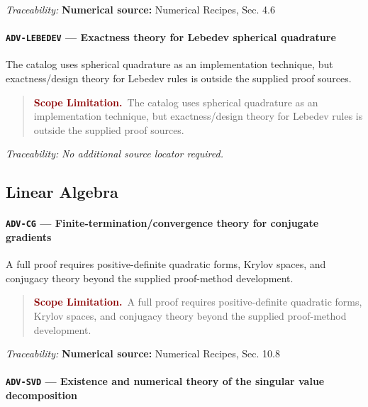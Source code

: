 \documentclass[10pt]{article}
\newcommand{\pidraw}[1]{\begingroup\urlstyle{tt}\nolinkurl{#1}\endgroup}
\theoremstyle{definition}
\theoremstyle{remark}
\newenvironment{scopelimitation}
{\begin{quote}\small\noindent\textbf{\textcolor{darkred}{Scope Limitation.}}\ }
{\end{quote}}
\begin{document}
\smallskip\noindent\textit{Traceability:} \textbf{Numerical source:} Numerical Recipes, Sec. 4.6\par

\label{prf:ADV-LEBEDEV}

\paragraph{\pidraw{ADV-LEBEDEV} --- Exactness theory for Lebedev spherical quadrature}

The catalog uses spherical quadrature as an implementation technique, but exactness/design theory for Lebedev rules is outside the supplied proof sources.

\begin{scopelimitation}The catalog uses spherical quadrature as an implementation technique, but exactness/design theory for Lebedev rules is outside the supplied proof sources.\end{scopelimitation}

\smallskip\noindent\textit{Traceability:} \emph{No additional source locator required.}\par

\subsection{Linear Algebra}

\label{prf:ADV-CG}

\paragraph{\pidraw{ADV-CG} --- Finite-termination/convergence theory for conjugate gradients}

A full proof requires positive-definite quadratic forms, Krylov spaces, and conjugacy theory beyond the supplied proof-method development.

\begin{scopelimitation}A full proof requires positive-definite quadratic forms, Krylov spaces, and conjugacy theory beyond the supplied proof-method development.\end{scopelimitation}

\smallskip\noindent\textit{Traceability:} \textbf{Numerical source:} Numerical Recipes, Sec. 10.8\par

\label{prf:ADV-SVD}

\paragraph{\pidraw{ADV-SVD} --- Existence and numerical theory of the singular value decomposition}
\end{document}
